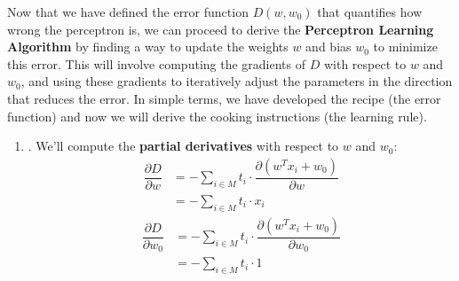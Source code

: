 Now that we have defined the error function $D\left(w, w_0\right)$ that quantifies how wrong the perceptron is, we can proceed to derive the \textbf{Perceptron Learning Algorithm} by finding a way to update the weights $w$ and bias $w_0$ to minimize this error. This will involve computing the gradients of $D$ with respect to $w$ and $w_0$, and using these gradients to iteratively adjust the parameters in the direction that reduces the error. In simple terms, we have developed the recipe (the error function) and now we will derive the cooking instructions (the learning rule).
\begin{enumerate}
    \item {}. We'll compute the \textbf{partial derivatives} with respect to $w$ and $w_0$:
    \begin{align*}
        \dfrac{\partial D}{\partial w}  &= - \sum_{i \in M} t_i \cdot \dfrac{\partial \left(w^T x_i + w_0\right)}{\partial w} \\[.3em]
                                        &= - \sum_{i \in M} t_i \cdot x_i
    \end{align*}
    \begin{align*}
        \dfrac{\partial D}{\partial w_0}&= - \sum_{i \in M} t_i \cdot \dfrac{\partial \left(w^T x_i + w_0\right)}{\partial w_0} \\[.3em]
                                        &= - \sum_{i \in M} t_i \cdot 1
    \end{align*}



\end{enumerate}
